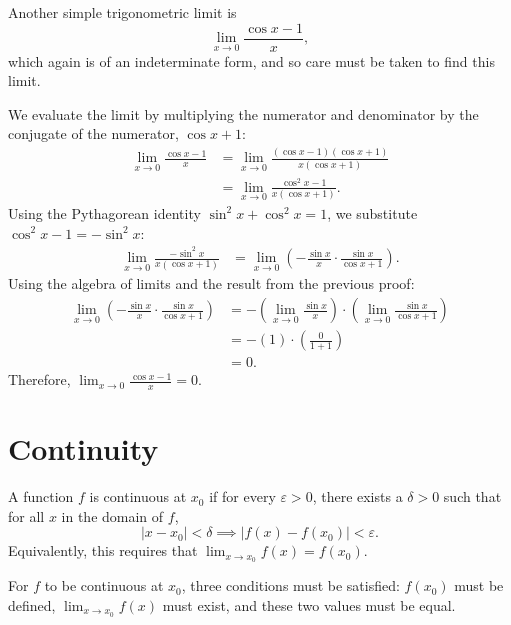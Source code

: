 \documentclass[../calculus.tex]{subfiles}
\begin{document}
\begin{example}
Another simple trigonometric limit is \[\lim_{x\to 0}\frac{\cos x-1}{x},\]
which again is of an indeterminate form, and so care must be taken to find this limit.

We evaluate the limit by multiplying the numerator and denominator by the conjugate of the numerator, $\cos x + 1$:
\begin{align*}
\lim_{x \to 0} \frac{\cos x - 1}{x} &= \lim_{x \to 0} \frac{(\cos x - 1)(\cos x + 1)}{x(\cos x + 1)} \\
&= \lim_{x \to 0} \frac{\cos^2 x - 1}{x(\cos x + 1)}.
\end{align*}
Using the Pythagorean identity $\sin^2 x + \cos^2 x = 1$, we substitute $\cos^2 x - 1 = -\sin^2 x$:
\begin{align*}
\lim_{x \to 0} \frac{-\sin^2 x}{x(\cos x + 1)} &= \lim_{x \to 0} \left( -\frac{\sin x}{x} \cdot \frac{\sin x}{\cos x + 1} \right).
\end{align*}
Using the algebra of limits and the result from the previous proof:
\begin{align*}
\lim_{x \to 0} \left( -\frac{\sin x}{x} \cdot \frac{\sin x}{\cos x + 1} \right) &= -\left( \lim_{x \to 0} \frac{\sin x}{x} \right) \cdot \left( \lim_{x \to 0} \frac{\sin x}{\cos x + 1} \right) \\
&= -(1) \cdot \left( \frac{0}{1 + 1} \right) \\
&= 0.
\end{align*}
Therefore, $\lim_{x \to 0} \frac{\cos x - 1}{x} = 0$.

\end{example}

\section{Continuity}

\begin{definition}
    \begin{shaded*}
    A function $f$ is continuous at $x_0$ if for every $\varepsilon>0$, there exists a $\delta>0$ such that for all $x$ in the domain of $f$,
    \[|x-x_0|<\delta \implies |f(x)-f(x_0)|<\varepsilon.\]
    Equivalently, this requires that $\lim_{x\to x_0}f(x)=f(x_0)$.
    \end{shaded*}
\end{definition}

\begin{remark}
    For $f$ to be continuous at $x_0$, three conditions must be satisfied: $f(x_0)$ must be defined, $\lim_{x\to x_0}f(x)$ must exist, and these two values must be equal.
\end{remark}
\end{document}
